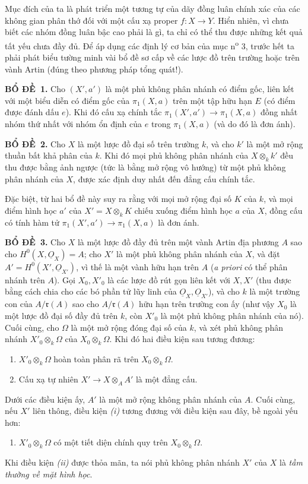 \documentclass[11pt,twoside,openany]{book}
\numberwithin{equation}{section}
\newcommand{\src}[1]{%
  \phantomsection\hypertarget{src:\fgasourceid:#1}{}%
  \marginpar{\raggedleft\footnotesize\sffamily #1}%
}
\newcommand{\fgasourceid}{unset}
\newcommand{\Osh}{\underline{O}}
\newcommand{\result}[2]{\par\medskip\noindent\textbf{#1\if\relax\detokenize{#2}\relax\else\ #2\fi.}\quad}
\begin{document}
\src{211}
Mục đích của ta là phát triển một tương tự của dãy đồng luân chính xác của các
không gian phân thớ đối với một cấu xạ proper $f:X\longrightarrow Y$. Hiển
nhiên, vì chưa biết các nhóm đồng luân bậc cao phải là gì, ta chỉ có thể thu
được những kết quả tất yếu chưa đầy đủ. Để áp dụng các định lý cơ bản của
mục n\textsuperscript{o} 3, trước hết ta phải phát biểu tường minh vài bổ đề sơ cấp về các lược đồ
trên trường hoặc trên vành Artin (đúng theo phương pháp tổng quát!).

\result{BỔ ĐỀ}{1} Cho $(X',a')$ là một phủ không phân nhánh có điểm gốc, liên
kết với một biểu diễn có điểm gốc của $\pi_1(X,a)$ trên một tập hữu hạn $E$
(có điểm được đánh dấu $e$). Khi đó cấu xạ chính tắc
$\pi_1(X',a')\longrightarrow\pi_1(X,a)$ đồng nhất nhóm thứ nhất với nhóm ổn
định của $e$ trong $\pi_1(X,a)$ (và do đó là đơn ánh).

\result{BỔ ĐỀ}{2} Cho $X$ là một lược đồ đại số trên trường $k$, và cho $k'$
là một mở rộng thuần bất khả phân của $k$. Khi đó mọi phủ không phân nhánh của
$X\otimes_k k'$ đều thu được bằng ảnh ngược (tức là bằng mở rộng vô hướng) từ
một phủ không phân nhánh của $X$, được xác định duy nhất đến đẳng cấu chính
tắc.

Đặc biệt, từ hai bổ đề này suy ra rằng với mọi mở rộng đại số $K$ của $k$, và
mọi điểm hình học $a'$ của $X'=X\otimes_k K$ chiếu xuống điểm hình học $a$ của
$X$, đồng cấu có tính hàm tử
$\pi_1(X',a')\longrightarrow\pi_1(X,a)$ là đơn ánh.

\result{BỔ ĐỀ}{3} Cho $X$ là một lược đồ đầy đủ trên một vành Artin địa phương
$A$ sao cho $H^0(X,\Osh_X)=A$; cho $X'$ là một phủ không phân nhánh của $X$,
và đặt $A'=H^0(X',\Osh_{X'})$, vì thế là một vành hữu hạn trên $A$
(\textit{a priori} có thể phân nhánh trên $A$). Gọi $X_0,X'_0$ là các lược đồ
rút gọn liên kết với $X,X'$ (thu được bằng cách chia cho các bó phần tử lũy
linh của $\Osh_X,\Osh_{X'}$), và cho $k$ là một trường con của
$A/\mathfrak r(A)$ sao cho $A/\mathfrak r(A)$ hữu hạn trên trường con ấy (như vậy
$X_0$ là một lược đồ đại số đầy đủ trên $k$, còn $X'_0$ là một phủ không phân
nhánh của nó). Cuối cùng, cho $\Omega$ là một mở rộng đóng đại số của $k$, và
xét phủ không phân nhánh $X'_0\otimes_k\Omega$ của
$X_0\otimes_k\Omega$. Khi đó hai điều kiện sau tương đương:
\begin{enumerate}
  \item[\textit{i.}] $X'_0\otimes_k\Omega$ hoàn toàn phân rã trên
    $X_0\otimes_k\Omega$.
  \item[\textit{ii.}] Cấu xạ tự nhiên
    $X'\longrightarrow X\otimes_A A'$ là một đẳng cấu.
\end{enumerate}
Dưới các điều kiện ấy, $A'$ là một mở rộng không phân nhánh của $A$. Cuối
cùng, nếu $X'$ liên thông, điều kiện \textit{(i)} tương đương với điều kiện
sau đây, bề ngoài yếu hơn:
\begin{enumerate}
  \item[\textit{i bis.}] $X'_0\otimes_k\Omega$ có một tiết diện chính quy
    trên $X_0\otimes_k\Omega$.
\end{enumerate}
Khi điều kiện \textit{(ii)} được thỏa mãn, ta nói phủ không phân nhánh $X'$
của $X$ là \emph{tầm thường về mặt hình học}.
\end{document}

